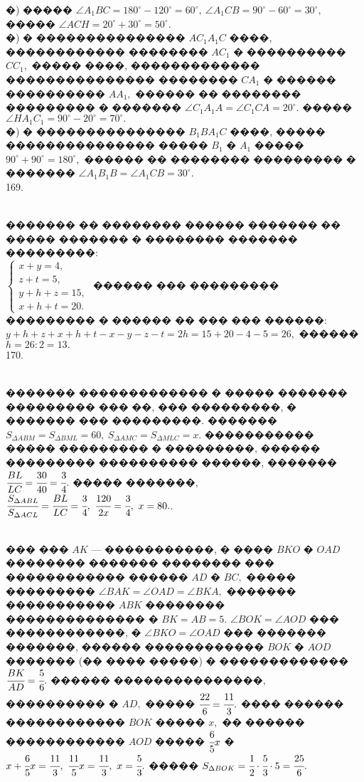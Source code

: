 \documentclass[12pt]{article}
\begin{document}
�) ����� $\angle A_1BC=180^\circ-120^\circ=60^\circ,\ \angle A_1CB=90^\circ-60^\circ=30^\circ,$ ����� $\angle ACH=20^\circ+30^\circ=50^\circ.$\\
�) � ��������������� $AC_1A_1C$ ����, ������������ �������� $AC_1$ � ���������� $CC_1,$ ����� ����, ������������� ��������������� �������� $CA_1$ � ������ ���������� $AA_1,$ ������ �� �������� ��������� � ������� $\angle C_1A_1A=\angle C_1CA=20^\circ.$ ����� $\angle HA_1C_1=90^\circ-20^\circ=70^\circ.$\\
�) � ��������������� $B_1BA_1C$ ����, ����� ��������������� ����� $B_1$ � $A_1$ ����� $90^\circ+90^\circ=180^\circ,$ ������ �� �������� ��������� � �������
$\angle A_1B_1B=\angle A_1CB=30^\circ.$\\
169. \begin{figure}[ht!]
\end{figure}\\
������� �� �������� ������ ������� �� ����� ������� � �������� ������� ���������:\\ $\begin{cases}x+y=4,\\ z+t=5,\\ y+h+z=15,\\ x+h+t=20.\end{cases}$ ������ ��� ��������� ��������� � ������ �� ��� ��� ������: $y+h+z+x+h+t-x-y-z-t=2h=15+20-4-5=26,$ ������ $h=26:2=13.$\\
170. \begin{figure}[ht!]
\end{figure}\\
������� ������������� � ����� ������� ��������� ��� ��, ��� ���������, � ������� ��� ���������. ������� $S_{\Delta ABM}=S_{\Delta BML}=60,\ S_{\Delta AMC}=S_{\Delta MLC}=x.$ ����������� ����� ��������� � ���������, ������ ��������� ���������� ������, ������� $\cfrac{BL}{LC}=\cfrac{30}{40}=\cfrac{3}{4}.$ ����� �������,
$\cfrac{S_{\Delta ABL}}{S_{\Delta ACL}}=\cfrac{BL}{LC}=\cfrac{3}{4},\ \cfrac{120}{2x}=\cfrac{3}{4},\ x=80.$\newpage{}. \begin{figure}[ht!]
\end{figure}\\
��� ��� $AK$ --- �����������, � ���� $BKO$ � $OAD$ �������� ������� �������� ��� ������������ ������ $AD$ � $BC,$ ����� ��������� $\angle BAK=\angle OAD=\angle BKA,$ ������� ����������� $ABK$ �������� �������������� � $BK=AB=5.$ $\angle BOK=\angle AOD$ ��� ������������, � $\angle BKO=\angle OAD$ ��� ������� �������, ������ ������������ $BOK$ � $AOD$ ������� (�� ���� �����) � ������������� $\cfrac{BK}{AD}=\cfrac{5}{6}.$ ������ ���������������, ���������� � $AD,$ ����� $\cfrac{22}{6}=\cfrac{11}{3}.$ ���� ������ ������������ $BOK$ ����� $x,$ �� ������ ������������ $AOD$ ����� $\cfrac{6}{5}x$ � $x+\cfrac{6}{5}x=\cfrac{11}{3},\ \cfrac{11}{5} x=\cfrac{11}{3},\ x=\cfrac{5}{3}.$ ����� $S_{\Delta BOK}=\cfrac{1}{2}\cdot\cfrac{5}{3}\cdot5=\cfrac{25}{6}.$\\
\end{document}
